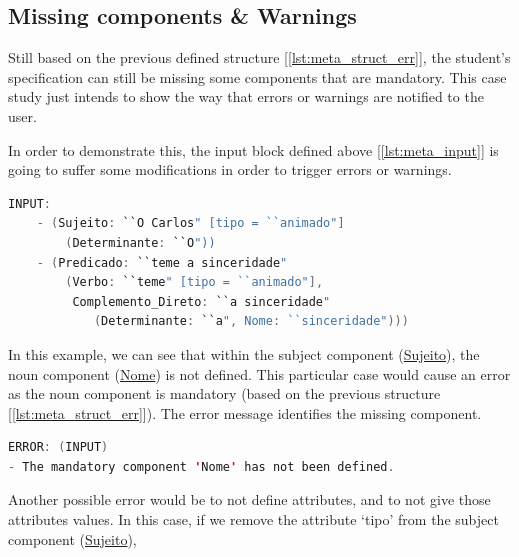 \subsection{Missing components \& Warnings}
Still based on the previous defined structure [\ref{lst:meta_struct_err}], the student's specification can still be missing some components that are mandatory. This case 
study just intends to show the way that errors or warnings are notified to the user.

In order to demonstrate this, the input block defined above [\ref{lst:meta_input}] is going to suffer some modifications in order to trigger errors or warnings.

\begin{center}
\begin{minipage}{13cm}
\begin{lstlisting}[language=java, basicstyle=\small, label={lst:meta_input_missing_comp}, caption=Example of the students parsing with missing component]
INPUT:
    - (Sujeito: ``O Carlos" [tipo = ``animado"]
        (Determinante: ``O"))
    - (Predicado: ``teme a sinceridade" 
        (Verbo: ``teme" [tipo = ``animado"], 
         Complemento_Direto: ``a sinceridade" 
            (Determinante: ``a", Nome: ``sinceridade")))
\end{lstlisting}
\end{minipage}
\end{center}

In this example, we can see that within the subject component (\underline{Sujeito}), the noun component (\underline{Nome}) is not defined. This particular case would
cause an error as the noun component is mandatory (based on the previous structure [\ref{lst:meta_struct_err}]). The error message identifies the missing component.

\begin{center}
\begin{minipage}{13cm}
\begin{lstlisting}[language=java, basicstyle=\small, label={lst:err_msg_missing_comp}, caption=Example error message of missing component]
ERROR: (INPUT) 
- The mandatory component 'Nome' has not been defined.
\end{lstlisting}
\end{minipage}
\end{center}
Another possible error would be to not define attributes, and to not give those attributes values. In this case, if we remove the attribute ‘tipo’ from the subject 
component (\underline{Sujeito}),

